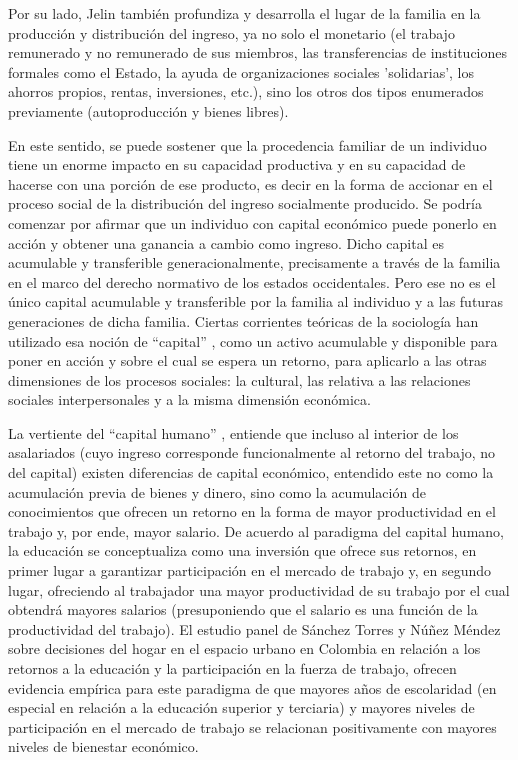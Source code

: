 Por su lado, Jelin \cite[p.~79]{jelin} también profundiza y desarrolla el lugar de la familia en la producción y distribución del ingreso, ya no solo el monetario (el trabajo remunerado y no remunerado de sus miembros, las transferencias de instituciones formales como el Estado, la ayuda de organizaciones sociales 'solidarias', los ahorros propios, rentas, inversiones, etc.), sino los otros dos tipos enumerados previamente (autoproducción y bienes libres).
	
En este sentido, se puede sostener que la procedencia familiar de un individuo tiene un enorme impacto en su capacidad productiva y en su capacidad de hacerse con una porción de ese producto, es decir en la forma de accionar en el proceso social de la distribución del ingreso socialmente producido. Se podría comenzar por afirmar que un individuo con capital económico puede ponerlo en acción y obtener una ganancia a cambio como ingreso. Dicho capital es acumulable y transferible generacionalmente, precisamente a través de la familia en el marco del derecho normativo de los estados occidentales. Pero ese no es el único capital acumulable y transferible por la familia al individuo y a las futuras generaciones de dicha familia. Ciertas corrientes teóricas de la sociología han utilizado esa noción de “capital” \cite{bourdieu2001}, como un activo acumulable y disponible para poner en acción y sobre el cual se espera un retorno, para aplicarlo a las otras dimensiones de los procesos sociales: la cultural, las relativa a las relaciones sociales interpersonales y a la misma dimensión económica.
	
La vertiente del “capital humano” \cite{mincer,beckar,schultz1961,schultz1962}, entiende que incluso al interior de los asalariados (cuyo ingreso corresponde funcionalmente al retorno del trabajo, no del capital) existen diferencias de capital económico, entendido este no como la acumulación previa de bienes y dinero, sino como la acumulación de conocimientos que ofrecen un retorno en la forma de mayor productividad en el trabajo y, por ende, mayor salario. De acuerdo al paradigma del capital humano, la educación se conceptualiza como una inversión que ofrece sus retornos, en primer lugar a garantizar participación en el mercado de trabajo y, en segundo lugar, ofreciendo al trabajador una mayor productividad de su trabajo por el cual obtendrá mayores salarios (presuponiendo que el salario es una función de la productividad del trabajo). El estudio panel de Sánchez Torres y Núñez Méndez \cite{sanchez} sobre decisiones del hogar en el espacio urbano en Colombia en relación a los retornos a la educación y la participación en la fuerza de trabajo, ofrecen evidencia empírica para este paradigma de que mayores años de escolaridad (en especial en relación a la educación superior y terciaria) y mayores niveles de participación en el mercado de trabajo se relacionan positivamente con mayores niveles de bienestar económico.
	
